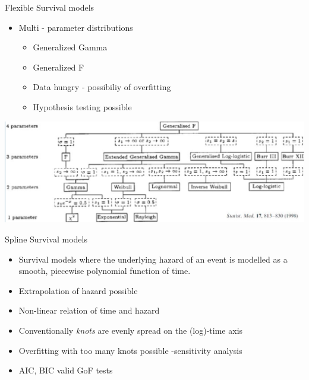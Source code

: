 \documentclass[
  ignorenonframetext,
]{beamer}
\providecommand{\tightlist}{%
  \setlength{\itemsep}{0pt}\setlength{\parskip}{0pt}}
\begin{document}
\begin{frame}{Flexible Survival models}
\protect\hypertarget{flexible-survival-models}{}

\begin{itemize}
\tightlist
\item
  Multi - parameter distributions

  \begin{itemize}
  \tightlist
  \item
    Generalized Gamma
  \item
    Generalized F
  \item
    Data hungry - possibiliy of overfitting\\
  \item
    Hypothesis testing possible
  \end{itemize}
\end{itemize}

\includegraphics[width=1\linewidth]{figures/genf}

\end{frame}

\begin{frame}{Spline Survival models}
\protect\hypertarget{spline-survival-models}{}

\begin{itemize}
\tightlist
\item
  Survival models where the underlying hazard of an event is modelled as
  a smooth, piecewise polynomial function of time.
\item
  Extrapolation of hazard possible
\item
  Non-linear relation of time and hazard
\item
  Conventionally \emph{knots} are evenly spread on the (log)-time axis
\item
  Overfitting with too many knots possible -sensitivity analysis
\item
  AIC, BIC valid GoF tests
\end{itemize}

\end{frame}
\end{document}
